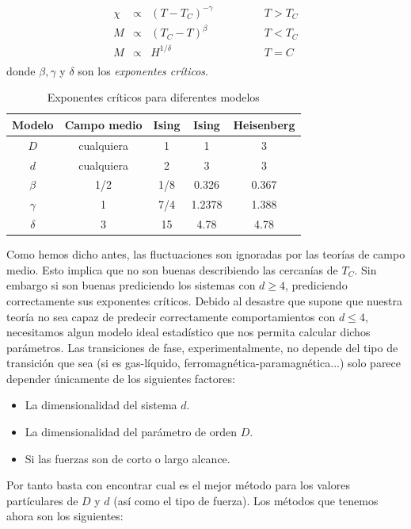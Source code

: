 \documentclass[12pt,a4paper]{book}
\numberwithin{equation}{section}
\numberwithin{figure}{section}
\newcommand{\tquad}{\quad \quad \quad}
\begin{document}
\begin{equation}
    \begin{array}{lllll}
       \chi & \varpropto  & (T-T_C)^{-\gamma} & \tquad & T > T_C   \\
       M & \varpropto  & (T_C-T)^{\beta} & \tquad &  T < T_C   \\
       M & \varpropto  & H^{1/\delta} & \tquad & T = C   \\
    \end{array}
\end{equation}
donde $\beta, \gamma$ y $\delta$ son los \textit{exponentes críticos}. \\

\begin{table}[h!]
    \centering
    \begin{tabular}{ccccc}\hline
       \textbf{Modelo}  & \textbf{Campo medio} & \textbf{Ising} & \textbf{Ising} & \textbf{Heisenberg}  \\ \hline
       $D$  & cualquiera & 1 & 1 & 3 \\
       $d$  &  cualquiera  & 2 & 3 & 3 \\
       $\beta$  &  1/2 & 1/8 & 0.326 & 0.367 \\
       $\gamma$  &  1 & 7/4 & 1.2378 & 1.388 \\
       $\delta$  &  3 & 15 & 4.78 & 4.78 \\
         \hline
    \end{tabular}
    \caption{Exponentes críticos para diferentes modelos}
    \label{Tab:06-04-01}
\end{table}
Como hemos dicho antes, las fluctuaciones son ignoradas por las teorías de campo medio. Esto implica que no son buenas describiendo las cercanías de $T_C$. Sin embargo si son buenas prediciendo los sistemas con $d\geq4$, prediciendo correctamente sus exponentes críticos. Debido al desastre que supone que nuestra teoría no sea capaz de predecir correctamente comportamientos con $d\leq4$, necesitamos algun modelo ideal estadístico que nos permita calcular dichos parámetros. Las transiciones de fase, experimentalmente, no depende del tipo de transición que sea (si es gas-líquido, ferromagnética-paramagnética...) solo parece depender únicamente de los siguientes factores:\\

\begin{itemize}
    \item La dimensionalidad del sistema $d$.
    \item La dimensionalidad del parámetro de orden $D$.
    \item Si las fuerzas son de corto o largo alcance.\\
\end{itemize}
Por tanto basta con encontrar cual es el mejor método para los valores partículares de $D$ y $d$ (así como el tipo de fuerza). Los métodos que tenemos ahora son los siguientes:\\
\end{document}
